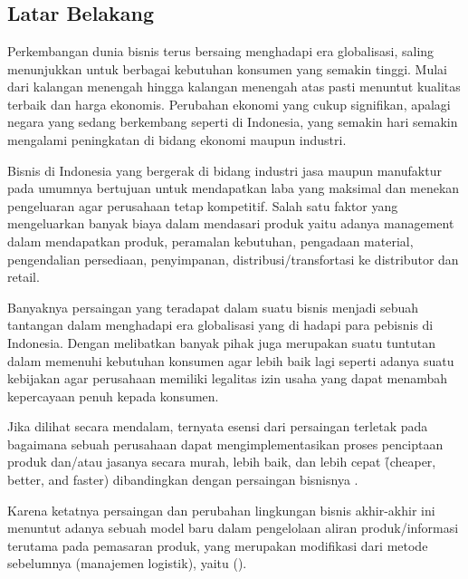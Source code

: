 \chapter{\babSatu}


\section{Latar Belakang}
Perkembangan dunia bisnis terus bersaing menghadapi era globalisasi, saling menunjukkan untuk berbagai kebutuhan konsumen yang semakin tinggi. Mulai dari kalangan menengah hingga kalangan menengah atas pasti menuntut kualitas terbaik dan harga ekonomis. Perubahan ekonomi yang cukup signifikan, apalagi negara yang sedang berkembang seperti di Indonesia, yang semakin hari semakin mengalami peningkatan di bidang ekonomi maupun industri.

Bisnis di Indonesia yang bergerak di bidang industri jasa maupun manufaktur pada umumnya bertujuan untuk mendapatkan laba yang maksimal dan menekan pengeluaran agar perusahaan tetap kompetitif. Salah satu faktor yang mengeluarkan banyak biaya dalam mendasari produk yaitu adanya management dalam mendapatkan produk, peramalan kebutuhan, pengadaan material, pengendalian persediaan, penyimpanan, distribusi/transfortasi ke distributor dan retail.

Banyaknya persaingan yang teradapat dalam suatu bisnis menjadi sebuah tantangan dalam menghadapi era globalisasi yang di hadapi para pebisnis di Indonesia. Dengan melibatkan banyak pihak juga merupakan suatu tuntutan dalam memenuhi kebutuhan konsumen agar lebih baik lagi seperti adanya suatu kebijakan agar perusahaan memiliki legalitas izin usaha yang dapat menambah kepercayaan penuh kepada konsumen.

Jika dilihat secara mendalam, ternyata esensi dari persaingan terletak pada bagaimana sebuah perusahaan dapat mengimplementasikan proses penciptaan produk dan/atau jasanya secara murah, lebih baik, dan lebih cepat \f{(cheaper, better, and faster)} dibandingkan dengan persaingan bisnisnya \cite{Manajemen}.

Karena ketatnya persaingan dan perubahan lingkungan bisnis akhir-akhir ini menuntut adanya sebuah model baru dalam pengelolaan aliran produk/informasi terutama pada pemasaran produk, yang merupakan modifikasi dari metode sebelumnya (manajemen logistik), yaitu \SCM (\scm).

